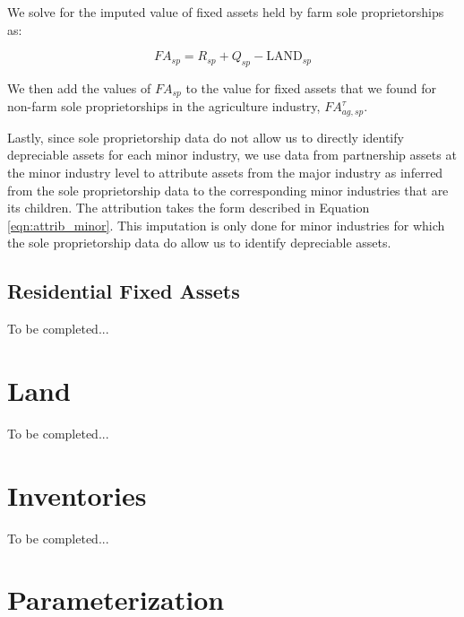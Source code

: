 \documentclass[article,11pt,letterpaper,fleqn]{article}
\theoremstyle{definition}
\numberwithin{equation}{section}
\begin{document}
We solve for the imputed value of fixed assets held by farm sole proprietorships as: 

\begin{equation}
{FA}_{sp}=R_{sp}+Q_{sp}-\text{LAND}_{sp}
\end{equation}

We then add the values of ${FA}_{sp}$ to the value for fixed assets that we found for non-farm sole proprietorships in the agriculture industry, ${FA}^{\tau}_{ag,sp}$.

Lastly, since sole proprietorship data do not allow us to directly identify depreciable assets for each minor industry, we use data from partnership assets at the minor industry level to attribute assets from the major industry as inferred from the sole proprietorship data to the corresponding minor industries that are its children.  The attribution takes the form described in Equation \ref{eqn:attrib_minor}.  This imputation is only done for minor industries for which the sole proprietorship data do allow us to identify depreciable assets.  

\subsection{Residential Fixed Assets}

To be completed...


\section{Land}
\label{sec:land}

To be completed...


\section{Inventories}
\label{sec:inventories}

To be completed...


\section{Parameterization}
\end{document}
